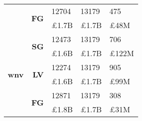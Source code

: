 \begin{table}[!htbp]
\begin{tabular}{r|r|>{\raggedleft\arraybackslash}p{3.5cm}|>{\raggedleft\arraybackslash}p{3.2cm}|>{\raggedleft\arraybackslash}p{3.5cm}}
\cline{2-5}
& \multirow{2}{*}{\textbf{FG}}
& {12704} & {13179} & {475}\\
& {} & {\pounds1.7B} & {\pounds1.7B} & {\pounds48M}\\
\hline
\multirow{6}{*}{\textbf{wnv}}
& \multirow{2}{*}{\textbf{SG}}
& {12473} & {13179} & {706}\\
& {} & {\pounds1.6B} & {\pounds1.7B} & {\pounds122M}\\
\cline{2-5}
& \multirow{2}{*}{\textbf{LV}}
& {12274} & {13179} & {905}\\
& {} & {\pounds1.6B} & {\pounds1.7B} & {\pounds99M}\\
\cline{2-5}
& \multirow{2}{*}{\textbf{FG}}
& {12871} & {13179} & {308}\\
& {} & {\pounds1.8B} & {\pounds1.7B} & {\pounds31M}
\end{tabular}
\end{table}

\clearpage

